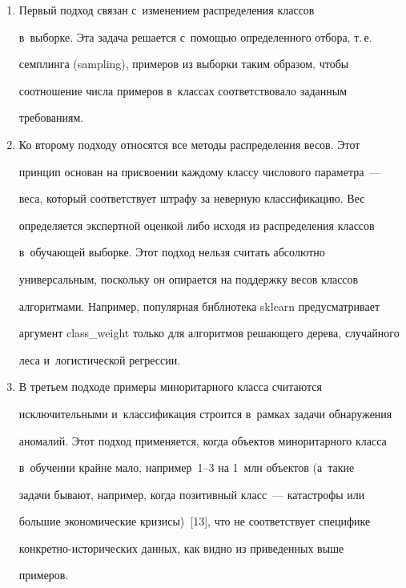   \begin{enumerate}[1.]


  \item Первый подход связан с~изменением распределения классов 


в~выборке. Эта задача решается с~помощью определенного отбора, т.\,е.\ 


семплинга (sampling), примеров из выборки таким образом, чтобы 


соотношение числа примеров в~классах соответствовало заданным 


требованиям. 


  \item Ко второму подходу относятся все методы распределения весов. Этот 


принцип основан на присвоении каждому классу числового параметра~--- 


веса, который соответствует штрафу за неверную классификацию. Вес 


определяется экспертной оценкой либо исходя из распределения классов 


в~обуча\-ющей выборке. Этот подход нельзя считать абсолютно 


универсальным, поскольку он опирается на поддержку весов классов 


алгоритмами. Например, популярная библиотека sklearn предусматривает 


аргумент class\_weight только для алгоритмов решающего дерева, случайного 


леса и~логистической регрессии.


\item В третьем подходе примеры миноритарного класса считаются 


исключительными и~классификация строится в~рамках задачи обнаружения 


аномалий. Этот подход применяется, когда объектов миноритарного класса 


в~обуче\-нии крайне мало, например~1--3 на 1~млн объектов (а~такие 


задачи бывают, например, когда позитивный класс~--- катастрофы или 


большие экономические кризисы)~[13], что не соответствует специфике  


кон\-крет\-но-ис\-то\-ри\-че\-ских данных, как видно из приведенных выше 


примеров.


  \end{enumerate}


